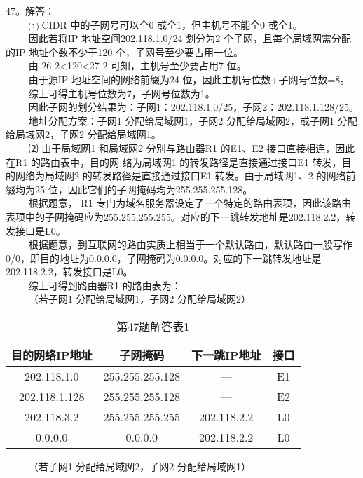 47。解答： \\
$\qquad$ ⑴ CIDR 中的子网号可以全0 或全1，但主机号不能全0 或全1。 \\
$\qquad$ 因此若将IP 地址空间202.118.1.0/24 划分为2 个子网，且每个局域网需分配的IP 地址个数不少于120 个，子网号至少要占用一位。 \\
$\qquad$ 由 26-2<120<27-2 可知，主机号至少要占用7 位。 \\
$\qquad$ 由于源IP 地址空间的网络前缀为24 位，因此主机号位数+子网号位数=8。 \\
$\qquad$ 综上可得主机号位数为7，子网号位数为1。 \\
$\qquad$ 因此子网的划分结果为：子网1：202.118.1.0/25，子网2：202.118.1.128/25。 \\
$\qquad$ 地址分配方案：子网1 分配给局域网1，子网2 分配给局域网2，或子网1 分配给局域网2，子网2 分配给局域网1。 \\
$\qquad$ ⑵ 由于局域网1 和局域网2 分别与路由器R1 的E1、E2 接口直接相连，因此在R1 的路由表中，目的网
络为局域网1 的转发路径是直接通过接口E1 转发，目的网络为局域网2 的转发路径是直接通过接口E1 转发。由于局域网1、2 的网络前缀均为25 位，因此它们的子网掩码均为255.255.255.128。 \\
$\qquad$ 根据题意， R1 专门为域名服务器设定了一个特定的路由表项，因此该路由表项中的子网掩码应为255.255.255.255。对应的下一跳转发地址是202.118.2.2，转发接口是L0。  \\
$\qquad$ 根据题意，到互联网的路由实质上相当于一个默认路由，默认路由一般写作0/0，即目的地址为0.0.0.0，子网掩码为0.0.0.0。对应的下一跳转发地址是202.118.2.2，转发接口是L0。 \\
$\qquad$ 综上可得到路由器R1 的路由表为： \\
$\qquad$ （若子网1 分配给局域网1，子网2 分配给局域网2）
\begin{table}[ht]
\centering
\caption{第47题解答表1}\label{tab_CSN09_8}
\begin{tabular}{|c|c|c|c|}
\hline
目的网络IP地址 & 子网掩码 & 下一跳IP地址 & 接口 \\
\hline
202.118.1.0 & 255.255.255.128 & — & E1 \\
\hline
202.118.1.128 & 255.255.255.128 & — & E2 \\
\hline
202.118.3.2 & 255.255.255.255 & 202.118.2.2 & L0 \\
\hline
0.0.0.0 & 0.0.0.0 & 202.118.2.2 & L0 \\
\hline
\end{tabular}
\end{table}
$\qquad$ （若子网1 分配给局域网2，子网2 分配给局域网1） \\
